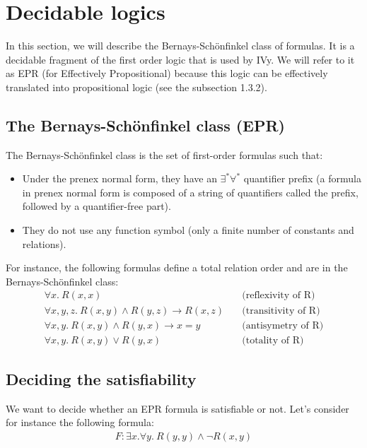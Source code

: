 \documentclass[11pt,a4paper,oldfontcommands]{memoir}
\begin{document}
    \section{Decidable logics}

    In this section, we will describe the Bernays-Schönfinkel class of formulas. It is a decidable fragment of the first order logic that is used by IVy.
    We will refer to it as EPR (for Effectively Propositional) because this logic can be effectively translated into propositional logic (see the subsection 1.3.2).

        \subsection{The Bernays-Schönfinkel class (EPR)}

        The Bernays-Schönfinkel class is the set of first-order formulas such that:
        \begin{itemize}
            \item Under the prenex normal form, they have an \(\exists^*\forall^*\) quantifier prefix
            (a formula in prenex normal form is composed of a string of quantifiers called the prefix, followed by a quantifier-free part).
            \item They do not use any function symbol (only a finite number of constants and relations).
        \end{itemize}

        For instance, the following formulas define a total relation order and are in the Bernays-Schönfinkel class:
        \begin{align*}
            \forall x. \ R(x,x) &\quad\text{(reflexivity of R)}\\
            \forall x,y,z. \ R(x,y) \land R(y,z) \rightarrow R(x,z) &\quad\text{(transitivity of R)}\\
            \forall x,y. \ R(x,y) \land R(y,x) \rightarrow x=y &\quad\text{(antisymetry of R)}\\
            \forall x,y. \ R(x,y) \lor R(y,x) &\quad\text{(totality of R)}
        \end{align*}

        \subsection{Deciding the satisfiability}

        We want to decide whether an EPR formula is satisfiable or not. Let's consider for instance the following formula:
        \begin{align*}
            F: \exists x. \forall y. \ R(y,y) \land \neg R(x,y)
        \end{align*}
\end{document}

